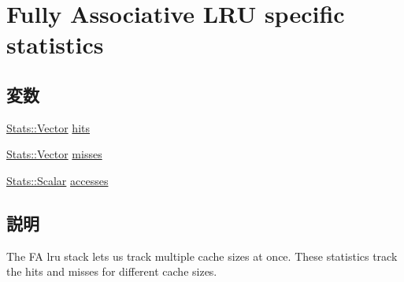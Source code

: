 \hypertarget{group__FALRUStats}{
\section{Fully Associative LRU specific statistics}
\label{group__FALRUStats}
}
\subsection*{変数}
\begin{DoxyCompactItemize}
\item 
\hyperlink{classStats_1_1Vector}{Stats::Vector} \hyperlink{group__FALRUStats_ga9fa327cedfd790f651b9218d749c7c73}{hits}
\item 
\hyperlink{classStats_1_1Vector}{Stats::Vector} \hyperlink{group__FALRUStats_gadc50dd8bb92cf864a73d259ac6c67ecd}{misses}
\item 
\hyperlink{classStats_1_1Scalar}{Stats::Scalar} \hyperlink{group__FALRUStats_ga60db2c0b2a8e7ec99712db305f2adf5d}{accesses}
\end{DoxyCompactItemize}


\subsection{説明}
The FA lru stack lets us track multiple cache sizes at once. These statistics track the hits and misses for different cache sizes. 

